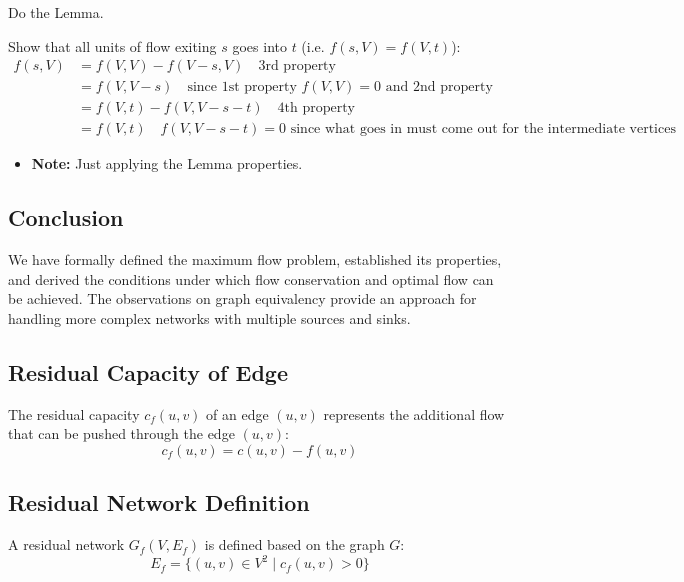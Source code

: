 \begin{warning}
    Do the Lemma. 
\end{warning}

\begin{example}
    Show that all units of flow exiting $s$ goes into $t$ (i.e. $f(s, V) = f(V,t)$):
    \begin{align*}
        f(s, V) &= f(V,V) - f(V - s, V) \quad \text{3rd property}\\
        &= f(V, V - s) \quad \text{since 1st property } f(V,V) = 0 \text{ and 2nd property}\\
        &= f(V, t) - f(V,V - s - t) \quad \text{4th property}\\ 
        &= f(V, t) \quad f(V, V - s - t) = 0 \text{ since what goes in must come out for the intermediate vertices}
    \end{align*}
    \begin{itemize}
        \item \textbf{Note:} Just applying the Lemma properties.
    \end{itemize}
\end{example}

\subsection{Conclusion}
\begin{summary}
    We have formally defined the maximum flow problem, established its properties, and derived the conditions under which flow conservation and optimal flow can be achieved. The observations on graph equivalency provide an approach for handling more complex networks with multiple sources and sinks.
\end{summary}

\subsection{Residual Capacity of Edge}
\begin{definition}
    The residual capacity $c_f(u, v)$ of an edge $(u, v)$ represents the additional flow that can be pushed through the edge $(u,v)$:
    \[
    c_f(u, v) = c(u, v) - f(u, v)
    \]
\end{definition}

\subsection{Residual Network Definition}
\begin{definition}
    A residual network $G_f(V, E_f)$ is defined based on the graph $G$:
    \[
    E_f = \{(u, v) \in V^2 \mid c_f(u, v) > 0\}
    \]
\end{definition}

